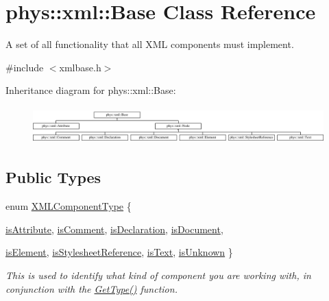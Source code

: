 \hypertarget{classphys_1_1xml_1_1Base}{
\section{phys::xml::Base Class Reference}
\label{df/d10/classphys_1_1xml_1_1Base}
}


A set of all functionality that all XML components must implement.  




{\ttfamily \#include $<$xmlbase.h$>$}

Inheritance diagram for phys::xml::Base:\begin{figure}[H]
\begin{center}
\leavevmode
\includegraphics[height=1.443299cm]{df/d10/classphys_1_1xml_1_1Base}
\end{center}
\end{figure}
\subsection*{Public Types}
\begin{DoxyCompactItemize}
\item 
enum \hyperlink{classphys_1_1xml_1_1Base_a62ba0484b5ecb502f9ae9d82d3720320}{XMLComponentType} \{ \par
\hyperlink{classphys_1_1xml_1_1Base_a62ba0484b5ecb502f9ae9d82d3720320af75393e041247190be1c922d0b3faf07}{isAttribute}, 
\hyperlink{classphys_1_1xml_1_1Base_a62ba0484b5ecb502f9ae9d82d3720320a38fcb00bdd7a8786331b6e716b958e95}{isComment}, 
\hyperlink{classphys_1_1xml_1_1Base_a62ba0484b5ecb502f9ae9d82d3720320ae3e48e223c26f696ddeca851a43407ea}{isDeclaration}, 
\hyperlink{classphys_1_1xml_1_1Base_a62ba0484b5ecb502f9ae9d82d3720320ac0126857d5de86b032851a39e0b32cc3}{isDocument}, 
\par
\hyperlink{classphys_1_1xml_1_1Base_a62ba0484b5ecb502f9ae9d82d3720320a334e5f8fbb7ca85f3e371c19b6aefd10}{isElement}, 
\hyperlink{classphys_1_1xml_1_1Base_a62ba0484b5ecb502f9ae9d82d3720320a1471515990373515c3fec0e021436709}{isStylesheetReference}, 
\hyperlink{classphys_1_1xml_1_1Base_a62ba0484b5ecb502f9ae9d82d3720320aba278067c2045c663334b7333c6b5f8f}{isText}, 
\hyperlink{classphys_1_1xml_1_1Base_a62ba0484b5ecb502f9ae9d82d3720320a00d10833cc80d919d22793cb52c20e92}{isUnknown}
 \}
\begin{DoxyCompactList}\small\item\em This is used to identify what kind of component you are working with, in conjunction with the \hyperlink{classphys_1_1xml_1_1Base_a46d0361efc953e06f26c059658a9a070}{GetType()} function. \item\end{DoxyCompactList}\end{DoxyCompactItemize}

